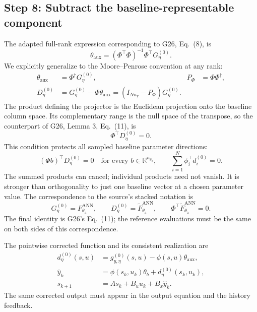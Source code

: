 \documentclass[11pt,a4paper]{article}
\newcommand{\R}{\mathbb R}
\begin{document}
\subsection*{Step 8: Subtract the baseline-representable component}
The adapted full-rank expression corresponding to G26, Eq.\ (8), is
\begin{equation}\label{eq:sourceaux}
\theta_{\mathrm{aux}}=(\Phi^\top\Phi)^{-1}\Phi^\top G_\eta^{(0)}.
\end{equation}
We explicitly generalize to the Moore--Penrose convention at any rank:
\begin{equation}\label{eq:originalprojection}
\begin{aligned}
\theta_{\mathrm{aux}}&=\Phi^\dagger G_\eta^{(0)},& P_\Phi&=\Phi\Phi^\dagger,\\
D_\eta^{(0)}&=G_\eta^{(0)}-\Phi \theta_{\mathrm{aux}}=(I_{Nn_{\mathrm y}}-P_\Phi)G_\eta^{(0)}.
\end{aligned}
\end{equation}
The product defining the projector is the Euclidean projection onto the baseline column space. Its complementary range is the null space of the transpose, so the counterpart of G26, Lemma 3, Eq.\ (11), is
\begin{equation}\label{eq:originalorthogonality}
\boxed{\Phi^\top D_\eta^{(0)}=0.}
\end{equation}
This condition protects all sampled baseline parameter directions:
\begin{equation}\label{eq:meaning}
(\Phi b)^\top D_\eta^{(0)}=0\quad\text{for every }b\in\R^{n_{\theta_{\mathrm b}}},
\qquad \sum_{i=1}^N\phi_i^\top d_i^{(0)}=0.
\end{equation}
The summed products can cancel; individual products need not vanish. It is stronger than orthogonality to just one baseline vector at a chosen parameter value.
The correspondence to the source's stacked notation is
\begin{equation}\label{eq:sourcestackmapping}
G_\eta^{(0)}=F_{\theta_{\mathrm a}}^{\mathrm{ANN}},\qquad
D_\eta^{(0)}=\tilde F_{\theta_{\mathrm a}}^{\mathrm{ANN}},\qquad
\Phi^\top\tilde F_{\theta_{\mathrm a}}^{\mathrm{ANN}}=0.
\end{equation}
The final identity is G26's Eq.\ (11); the reference evaluations must be the same on both sides of this correspondence.

The pointwise corrected function and its consistent realization are
\begin{equation}\label{eq:originalcorrected}
\begin{aligned}
d_\eta^{(0)}(s,u)&=g_{y,\eta}^{(0)}(s,u)-\phi(s,u)\theta_{\mathrm{aux}},\\
\hat y_k&=\phi(s_k,u_k)\theta_b+d_\eta^{(0)}(s_k,u_k),\\
s_{k+1}&=As_k+B_u u_k+B_x\hat y_k.
\end{aligned}
\end{equation}
The same corrected output must appear in the output equation and the history feedback.
\end{document}
